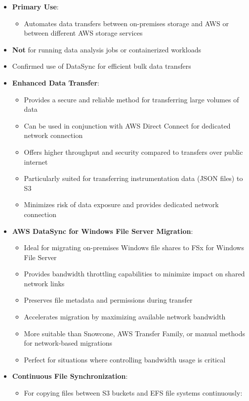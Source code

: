 \documentclass[11pt,a4paper]{report}
\begin{document}
\begin{itemize}
  \item \textbf{Primary Use}:
\begin{itemize}
  \item Automates data transfers between on-premises storage and AWS or between different AWS storage services
\end{itemize}
  \item \textbf{Not} for running data analysis jobs or containerized workloads
  \item Confirmed use of DataSync for efficient bulk data transfers
  \item \textbf{Enhanced Data Transfer}:
\begin{itemize}
  \item Provides a secure and reliable method for transferring large volumes of data
  \item Can be used in conjunction with AWS Direct Connect for dedicated network connection
  \item Offers higher throughput and security compared to transfers over public internet
  \item Particularly suited for transferring instrumentation data (JSON files) to S3
  \item Minimizes risk of data exposure and provides dedicated network connection
\end{itemize}
  \item \textbf{AWS DataSync for Windows File Server Migration}:
\begin{itemize}
  \item Ideal for migrating on-premises Windows file shares to FSx for Windows File Server
  \item Provides bandwidth throttling capabilities to minimize impact on shared network links
  \item Preserves file metadata and permissions during transfer
  \item Accelerates migration by maximizing available network bandwidth
  \item More suitable than Snowcone, AWS Transfer Family, or manual methods for network-based migrations
  \item Perfect for situations where controlling bandwidth usage is critical
\end{itemize}
  \item \textbf{Continuous File Synchronization}:
\begin{itemize}
  \item For copying files between S3 buckets and EFS file systems continuously:

\end{itemize}
\end{itemize}
\end{document}
